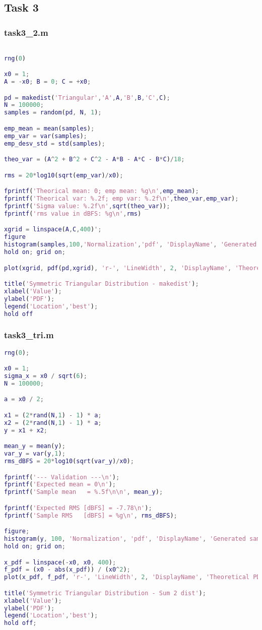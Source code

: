 \subsection{Task 3}
\subsubsection{task3\_2.m}

\begin{lstlisting}[language=Matlab]

rng(0)

x0 = 1;
A = -x0; B = 0; C = +x0;

pd = makedist('Triangular','A',A,'B',B,'C',C);
N = 100000;
samples = random(pd, N, 1);

emp_mean = mean(samples);
emp_var = var(samples);
emp_desv_std = std(samples);

theo_var = (A^2 + B^2 + C^2 - A*B - A*C - B*C)/18;

rms = 20*log10(sqrt(emp_var)/x0);

fprintf('Theorical mean: 0; emp mean: %g\n',emp_mean);
fprintf('Theorical var: %.2f; emp var: %.2f\n',theo_var,emp_var);
fprintf('Sigma value: %.2f\n',sqrt(theo_var));
fprintf('rms value in dBFS: %g\n',rms)

xgrid = linspace(A,C,400)';
figure
histogram(samples,100,'Normalization','pdf', 'DisplayName', 'Generated samples')
hold on; grid on;

plot(xgrid, pdf(pd,xgrid), 'r-', 'LineWidth', 2, 'DisplayName', 'Theoretical PDF');

title('Symmetric Triangular Distribution - makedist');
xlabel('Value');
ylabel('PDF');
legend('Location','best');
hold off
\end{lstlisting}

\subsubsection{task3\_tri.m}
\begin{lstlisting}[language=Matlab]
rng(0);

x0 = 1;
sigma_x = x0 / sqrt(6);
N = 100000;

a = x0 / 2;

x1 = (2*rand(N,1) - 1) * a;
x2 = (2*rand(N,1) - 1) * a;
y = x1 + x2;

mean_y = mean(y);
var_y = var(y,1);
rms_dBFS = 20*log10(sqrt(var_y)/x0);

fprintf('--- Validation ---\n');
fprintf('Expected mean = 0\n');
fprintf('Sample mean   = %.5f\n\n', mean_y);

fprintf('Expected RMS [dBFS] = -7.78\n');
fprintf('Sample RMS   [dBFS] = %g\n', rms_dBFS);

figure;
histogram(y, 100, 'Normalization', 'pdf', 'DisplayName', 'Generated samples');
hold on; grid on;

x_pdf = linspace(-x0, x0, 400);
f_pdf = (x0 - abs(x_pdf)) / (x0^2);
plot(x_pdf, f_pdf, 'r-', 'LineWidth', 2, 'DisplayName', 'Theoretical PDF');

title('Symmetric Triangular Distribution - Sum 2 dist');
xlabel('Value');
ylabel('PDF');
legend('Location','best');
hold off;

\end{lstlisting}

